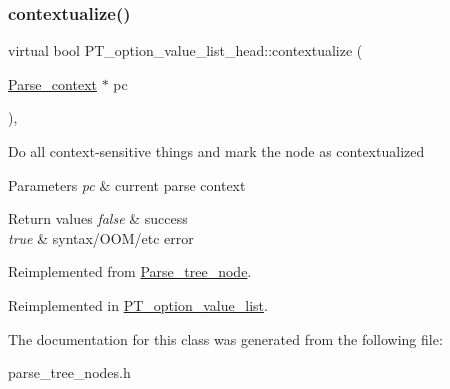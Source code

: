 \subsubsection{\texorpdfstring{contextualize()}{contextualize()}}
{\footnotesize\ttfamily virtual bool P\+T\+\_\+option\+\_\+value\+\_\+list\+\_\+head\+::contextualize (\begin{DoxyParamCaption}\item[{\mbox{\hyperlink{structParse__context}{Parse\+\_\+context}} $\ast$}]{pc }\end{DoxyParamCaption})\hspace{0.3cm}{\ttfamily [inline]}, {\ttfamily [virtual]}}

Do all context-\/sensitive things and mark the node as contextualized


\begin{DoxyParams}{Parameters}
{\em pc} & current parse context\\
\hline
\end{DoxyParams}

\begin{DoxyRetVals}{Return values}
{\em false} & success \\
\hline
{\em true} & syntax/\+O\+O\+M/etc error \\
\hline
\end{DoxyRetVals}


Reimplemented from \mbox{\hyperlink{classParse__tree__node_a22d93524a537d0df652d7efa144f23da}{Parse\+\_\+tree\+\_\+node}}.



Reimplemented in \mbox{\hyperlink{classPT__option__value__list_a11d23499d057d978727592d5b9d366c2}{P\+T\+\_\+option\+\_\+value\+\_\+list}}.



The documentation for this class was generated from the following file\+:\begin{DoxyCompactItemize}
\item 
parse\+\_\+tree\+\_\+nodes.\+h\end{DoxyCompactItemize}

